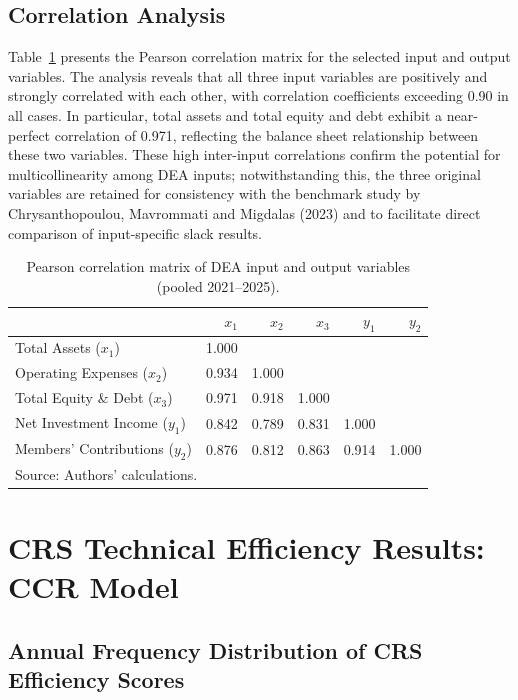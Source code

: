 \documentclass[12pt,a4paper]{article}
\begin{document}
\subsection{Correlation Analysis}

Table~\ref{tab:correlation} presents the Pearson correlation matrix for the selected input and output variables. The analysis reveals that all three input variables are positively and strongly correlated with each other, with correlation coefficients exceeding 0.90 in all cases. In particular, total assets and total equity and debt exhibit a near-perfect correlation of 0.971, reflecting the balance sheet relationship between these two variables. These high inter-input correlations confirm the potential for multicollinearity among DEA inputs; notwithstanding this, the three original variables are retained for consistency with the benchmark study by Chrysanthopoulou, Mavrommati and Migdalas (2023) and to facilitate direct comparison of input-specific slack results.

\begin{table}[H]
\centering
\caption{Pearson correlation matrix of DEA input and output variables (pooled 2021--2025).}
\label{tab:correlation}
\begin{tabular}{lrrrrr}
\toprule
 & $x_1$ & $x_2$ & $x_3$ & $y_1$ & $y_2$ \\
\midrule
Total Assets ($x_1$)           & 1.000 &       &       &       &       \\
Operating Expenses ($x_2$)     & 0.934 & 1.000 &       &       &       \\
Total Equity \& Debt ($x_3$)   & 0.971 & 0.918 & 1.000 &       &       \\
Net Investment Income ($y_1$)  & 0.842 & 0.789 & 0.831 & 1.000 &       \\
Members' Contributions ($y_2$) & 0.876 & 0.812 & 0.863 & 0.914 & 1.000 \\
\bottomrule
\multicolumn{6}{l}{\footnotesize Source: Authors' calculations.}
\end{tabular}
\end{table}


\section{CRS Technical Efficiency Results: CCR Model}

\subsection{Annual Frequency Distribution of CRS Efficiency Scores}
\end{document}

